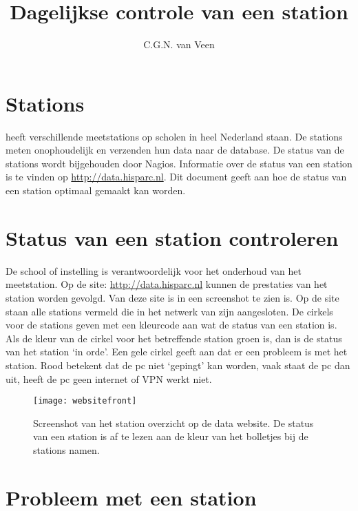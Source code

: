 

\title{Dagelijkse controle van een station}
\author{C.G.N. van Veen}



\maketitle

\section{Stations}

\hisparc heeft verschillende meetstations op scholen in heel Nederland
staan. De stations meten onophoudelijk en verzenden hun data naar de
\hisparc database. De status van de \hisparc stations wordt bijgehouden
door Nagios. Informatie over de status van een station is te vinden op
\url{http://data.hisparc.nl}. Dit document geeft aan hoe de status van
een station optimaal gemaakt kan worden.


\section{Status van een station controleren}

De school of instelling is verantwoordelijk voor het onderhoud van het
meetstation. Op de site: \url{http://data.hisparc.nl} kunnen de
prestaties van het station worden gevolgd. Van deze site is in
 een screenshot te zien is. Op de site staan alle
stations vermeld die in het netwerk van \hisparc zijn aangesloten. De
cirkels voor de stations geven met een kleurcode aan wat de status van
een station is. Als de kleur van de cirkel voor het betreffende station
groen is, dan is de status van het station `in orde'. Een gele cirkel
geeft aan dat er een probleem is met het station. Rood betekent dat de
pc niet `gepingt' kan worden, vaak staat de pc dan uit, heeft de pc geen
internet of VPN werkt niet.

\begin{figure}
    \centering \texttt{[image: websitefront]}
    \caption{Screenshot van het station overzicht op de \hisparc data
             website. De status van een station is af te lezen aan de
             kleur van het bolletjes bij de stations namen.} 
    \label{fig:frontweb}
\end{figure}


\section{Probleem met een station}

